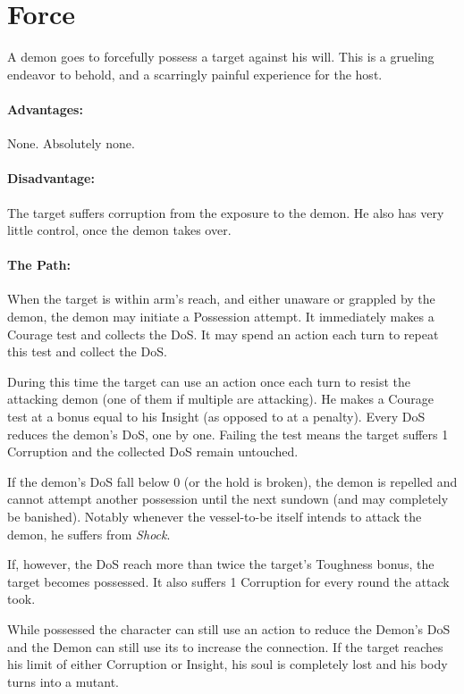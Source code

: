 \section{Force}
A demon goes to forcefully possess a target against his will.
This is a grueling endeavor to behold,
and a scarringly painful experience for the host.
\paragraph{Advantages:}
None. Absolutely none.
\paragraph{Disadvantage:}
The target suffers corruption from the exposure to the demon.
He also has very little control, once the demon takes over.
\paragraph{The Path:}
When the target is within arm's reach, and either unaware or grappled by the demon, the demon may initiate a Possession attempt.
It immediately makes a Courage test and collects the DoS.
It may spend an action each turn to repeat this test and collect the DoS.
\par \vspace{-5mm}
During this time the target can use an action once each turn to resist the attacking demon
	(one of them if multiple are attacking).
He makes a Courage test at a bonus equal to his Insight (as opposed to at a penalty).
Every DoS reduces the demon's DoS, one by one.
Failing the test means the target suffers 1 Corruption and the collected DoS remain untouched.
\par \vspace{-5mm}
If the demon's DoS fall below 0 (or the hold is broken), the demon is repelled and cannot attempt another possession until the next sundown (and may completely be banished).
Notably whenever the vessel-to-be itself intends to attack the demon, he suffers from \emph{Shock}.
\par \vspace{-5mm}
If, however, the DoS reach more than twice the target's Toughness bonus, the target becomes possessed.
It also suffers 1 Corruption for every round the attack took.
\par \vspace{-5mm}
While possessed the character can still use an action to reduce the Demon's DoS and the Demon can still use its to increase the connection.
If the target reaches his limit of either Corruption or Insight, his soul is completely lost and his body turns into a mutant.
